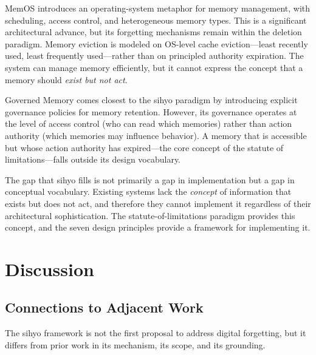 \documentclass[12pt]{article}
\begin{document}
MemOS \citep{memos-2025} introduces an operating-system metaphor for memory management, with scheduling, access control, and heterogeneous memory types. This is a significant architectural advance, but its forgetting mechanisms remain within the deletion paradigm. Memory eviction is modeled on OS-level cache eviction---least recently used, least frequently used---rather than on principled authority expiration. The system can manage memory efficiently, but it cannot express the concept that a memory should \emph{exist but not act}.

Governed Memory \citep{governed-memory-2026} comes closest to the sihyo paradigm by introducing explicit governance policies for memory retention. However, its governance operates at the level of access control (who can read which memories) rather than action authority (which memories may influence behavior). A memory that is accessible but whose action authority has expired---the core concept of the statute of limitations---falls outside its design vocabulary.

The gap that sihyo fills is not primarily a gap in implementation but a gap in conceptual vocabulary. Existing systems lack the \emph{concept} of information that exists but does not act, and therefore they cannot implement it regardless of their architectural sophistication. The statute-of-limitations paradigm provides this concept, and the seven design principles provide a framework for implementing it.

\section{Discussion}
\label{sec:discussion}

\subsection{Connections to Adjacent Work}
\label{sec:adjacent-work}

The sihyo framework is not the first proposal to address digital forgetting, but it differs from prior work in its mechanism, its scope, and its grounding.
\end{document}

